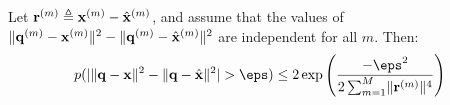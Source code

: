 
\begin{lemma}
Let $\mathbf{r}^{(m)} \triangleq \mathbf{x}^{(m)} - \hat{\mathbf{x}}^{(m)}$, and assume that the values of $\lVert\mathbf{q}^{(m)} - \mathbf{x}^{(m)} \rVert^2 - \lVert\mathbf{q}^{(m)} - \hat{\mathbf{x}}^{(m)} \rVert^2$ are independent for all $m$. Then: %
\begin{align} \label{eq:l2_indep}
    p(\abs{ \norm{\q - \x}^2 - \norm{\q - \xhat}^2 } > \eps) \le
        2\exp \left( \frac{-\eps^2}{
            2 \sum_{m=1}^M \norm{\r^{(m)}}^4
        }\right)
\end{align}
\end{lemma}
